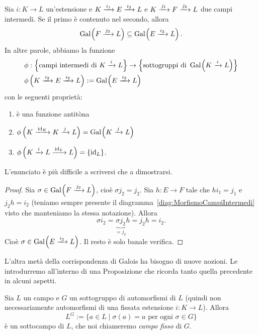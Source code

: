 \begin{prop}\label{prop:CorrispondenzaGaloisI}
Sia \(i : K \to L\) un'estensione e \(K \xrightarrow{\,i_1\,} E \xrightarrow{\,i_2\,} L\) e \(K \xrightarrow{\,j_1\,} F \xrightarrow{\,j_2\,} L\) due campi intermedi. Se il primo è contenuto nel secondo, allora
\[\operatorname{Gal}_{}\!\left(F \xrightarrow{\,j_2\,} L\right) \subseteq \operatorname{Gal}_{}\!\left(E \xrightarrow{\,i_2\,} L\right) .\] 
In altre parole, abbiamo la funzione
\begin{align*}
& \phi : \left\{ \text{campi intermedi di } K \xrightarrow{\,i\,} L \right\} \to \left\{ \text{sottogruppi di } \operatorname{Gal}_{}\!\left(K \xrightarrow{\,i\,} L\right) \right\} \\
& \phi\left(K \xrightarrow{\,i_2\,} E \xrightarrow{\,i_2\,} L \right) := \operatorname{Gal}_{}\!\left(E \xrightarrow{\,i_2\,} L\right)
\end{align*}
con le seguenti proprietà:
\begin{enumerate}
\item è una funzione antitòna 
\item \(\phi\left(K \xrightarrow{\,\mathrm{id}_K\,} K \xrightarrow{\,j\,} L\right) = \operatorname{Gal}_{}\!\left(K \xrightarrow{\,j\,} L\right)\)
\item \(\phi\left(K \xrightarrow{\,i\,} L \xrightarrow{\,\mathrm{id}_L\,} L\right) = \left\{\mathrm{id}_L\right\}\).
\end{enumerate}
\end{prop}

L'enunciato è più difficile a scriversi che a dimostrarsi.

\begin{proof}
Sia \(\sigma \in \operatorname{Gal}_{}\!\left(F \xrightarrow{\,j_2\,} L\right)\), cioè \(\sigma j_2 = j_2\). Sia \(h : E \to F\) tale che \(hi_1 = j_1\) e \(j_2h = i_2\) (teniamo sempre presente il diagramma~\eqref{diag:MorfismoCampiIntermedi} visto che manteniamo la stessa notazione). Allora
\[\sigma i_2 = \underbrace{\sigma j_2}_{= j_2} h = j_2 h = i_2 .\]
Cioè \(\sigma \in \operatorname{Gal}_{}\!\left(E \xrightarrow{\,i_2\,} L\right)\). Il resto è solo banale verifica.
\end{proof}


L'altra metà della corrispondenza di Galois ha bisogno di nuove nozioni. Le introdurremo all'interno di una Proposizione che ricorda tanto quella precedente in alcuni aspetti. 

\begin{lemm}
Sia \(L\) un campo e \(G\) un sottogruppo di automorfismi di \(L\) (quindi non necessariamente automorfismi di una fissata estensione \(i : K \to L\)). Allora
\[L^G := \{ a \in L \mid \sigma(a) = a \text{ per ogni } \sigma \in G\}\]
è un sottocampo di \(L\), che noi chiameremo {\em campo fisso} di \(G\).
\end{lemm}

